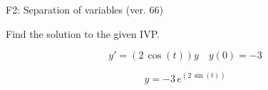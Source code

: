 \begin{exercise}
  \begin{exerciseTitle}F2: Separation of variables (ver. 66)\end{exerciseTitle}
  \begin{exerciseStatement}
    
Find the solution to the given IVP.

    
\[y'=( 2 \, \cos\left(t\right) )y\hspace{1em} y(0)= -3\]

  \end{exerciseStatement}
  \begin{exerciseAnswer}
    
\[y= -3 \, e^{\left(2 \, \sin\left(t\right)\right)}\]

  \end{exerciseAnswer}
\end{exercise}